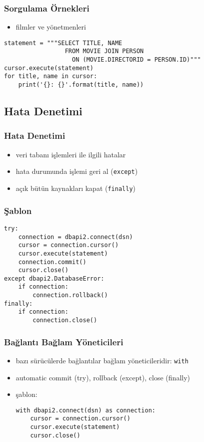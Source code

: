 \documentclass[dvipsnames]{beamer}
\theoremstyle{plain}
\begin{document}
\begin{frame}[fragile]
  \frametitle{Sorgulama Örnekleri}

  \begin{itemize}
    \item filmler ve yönetmenleri
  \end{itemize}

  \begin{lstlisting}
statement = """SELECT TITLE, NAME
                 FROM MOVIE JOIN PERSON
                   ON (MOVIE.DIRECTORID = PERSON.ID)"""
cursor.execute(statement)
for title, name in cursor:
    print('{}: {}'.format(title, name))
  \end{lstlisting}
\end{frame}

\subsection{Hata Denetimi}

\begin{frame}
  \frametitle{Hata Denetimi}

  \begin{itemize}
    \item veri tabanı işlemleri ile ilgili hatalar

    \medskip
    \item hata durumunda işlemi geri al (\lstinline!except!)
    \item açık bütün kaynakları kapat (\lstinline!finally!)
  \end{itemize}
\end{frame}

\begin{frame}[fragile]
  \frametitle{Şablon}

  \begin{lstlisting}
try:
    connection = dbapi2.connect(dsn)
    cursor = connection.cursor()
    cursor.execute(statement)
    connection.commit()
    cursor.close()
except dbapi2.DatabaseError:
    if connection:
        connection.rollback()
finally:
    if connection:
        connection.close()
  \end{lstlisting}
\end{frame}

\begin{frame}[fragile]
  \frametitle{Bağlantı Bağlam Yöneticileri}

  \begin{itemize}
    \item bazı sürücülerde bağlantılar bağlam yöneticileridir: \lstinline!with!
    \item automatic commit (try), rollback (except), close (finally)

    \medskip
    \item şablon:
    \begin{lstlisting}
with dbapi2.connect(dsn) as connection:
    cursor = connection.cursor()
    cursor.execute(statement)
    cursor.close()
    \end{lstlisting}
  \end{itemize}
\end{frame}
\end{document}
